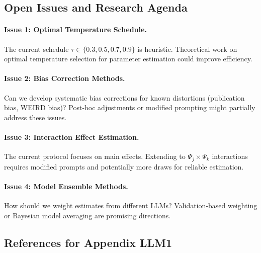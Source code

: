 
\subsection{Open Issues and Research Agenda}
\label{sec:AN-openissues}

\paragraph{Issue 1: Optimal Temperature Schedule.}
The current schedule $\tau \in \{0.3, 0.5, 0.7, 0.9\}$ is heuristic.
Theoretical work on optimal temperature selection for parameter estimation
could improve efficiency.

\paragraph{Issue 2: Bias Correction Methods.}
Can we develop systematic bias corrections for known distortions
(publication bias, WEIRD bias)? Post-hoc adjustments or modified
prompting might partially address these issues.

\paragraph{Issue 3: Interaction Effect Estimation.}
The current protocol focuses on main effects. Extending to
$\Psi_j \times \Psi_k$ interactions requires modified prompts
and potentially more draws for reliable estimation.

\paragraph{Issue 4: Model Ensemble Methods.}
How should we weight estimates from different LLMs?
Validation-based weighting or Bayesian model averaging
are promising directions.


\subsection{References for Appendix LLM1}
\label{sec:AN-references}


